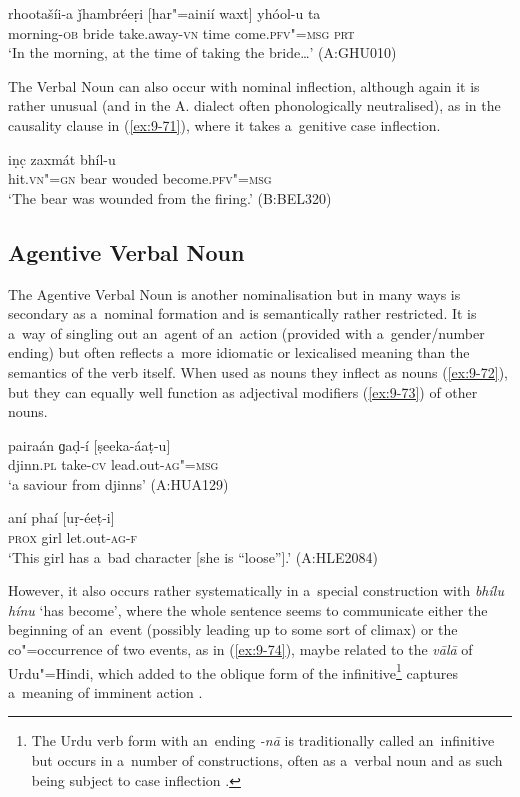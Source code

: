 \begin{exe}
\ex
\label{ex:9-70}
\gll rhootašíi-a ǰhambréeṛi [har"=ainií waxt] yhóol-u ta \\
morning-\textsc{ob} bride take.away-\textsc{vn} time come.\textsc{pfv"=msg} \textsc{prt} \\
\glt `In the morning, at the time of taking the bride{\ldots}' (A:GHU010)
\end{exe}

The Verbal Noun can also occur with nominal inflection, although again it is rather unusual (and in the A. dialect often phonologically neutralised), as in the causality clause in (\ref{ex:9-71}), where it takes a~genitive case inflection. 

\begin{exe}
\ex
\label{ex:9-71}
\gll [ǰeníi-e] iṇc̣ zaxmát bhíl-u \\
hit.\textsc{vn"=gn} bear wouded become.\textsc{pfv"=msg} \\
\glt `The bear was wounded from the firing.' (B:BEL320)
\end{exe}

\subsection{Agentive Verbal Noun}
\label{subsec:9-3-4}


The Agentive Verbal Noun is another nominalisation but in many ways is secondary as a~nominal formation and is semantically rather restricted. It is a~way of singling out an~agent of an~action (provided with a~gender/number ending) but often reflects a~more idiomatic or lexicalised meaning than the semantics of the verb itself. When used as nouns they inflect as nouns (\ref{ex:9-72}), but they can equally well function as adjectival modifiers (\ref{ex:9-73}) of other nouns.

\begin{exe}
\ex
\label{ex:9-72}
\gll pairaán ɡaḍ-í [ṣeeka-áaṭ-u] \\
djinn.\textsc{pl} take-\textsc{cv} lead.out-\textsc{ag"=msg} \\
\glt `a saviour from djinns' (A:HUA129)

\ex
\label{ex:9-73}
\gll aní phaí [uṛ-éeṭ-i] \\
\textsc{prox} girl let.out-\textsc{ag-f} \\
\glt `This girl has a~bad character [she is ``loose''].' (A:HLE2084)
\end{exe}

However, it also occurs rather systematically in a~special construction with \textit{bhílu hínu} `has become', where the whole sentence seems to communicate either the beginning of an~event (possibly leading up to some sort of climax) or the co"=occurrence of two events, as in (\ref{ex:9-74}), maybe related to the \textit{vālā} of Urdu"=Hindi, which added to the oblique form of the infinitive\footnote{The Urdu verb form with an~ending \textit{-nā} is traditionally called an~infinitive but occurs in a~number of constructions, often as a~verbal noun and as such being subject to case inflection \citep[132--142]{schmidt1999}.} captures a~meaning of imminent action \citep[139]{schmidt1999}. 

